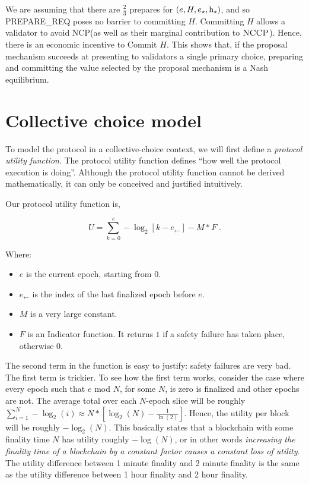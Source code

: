 \documentclass[12pt, final]{article}
\newcommand{\epoch}{\ensuremath{e}}
\newcommand{\hash}{\textnormal{h}}
\newcommand{\hashsource}{\hash_{\star}\xspace}
\newcommand{\epochsource}{\epoch_{\star}\xspace}
\newcommand{\NCP}{\textsc{NCP}\xspace}
\newcommand{\NCCP}{\textsc{NCCP}\xspace}
\newcommand{\LFE}{ \ensuremath{\epoch_{\leftarrow}} \xspace}
\begin{document}
We are assuming that there are $\frac{2}{3}$ prepares for $(e, H, \epochsource, \hashsource)$, and so PREPARE\_REQ poses no barrier to committing $H$. Committing $H$ allows a validator to avoid \NCP (as well as their marginal contribution to $\NCCP$). Hence, there is an economic incentive to Commit $H$. This shows that, if the proposal mechanism succeeds at presenting to validators a single primary choice, preparing and committing the value selected by the proposal mechanism is a Nash equilibrium.

\section{Collective choice model}

To model the protocol in a collective-choice context, we will first define a \emph{protocol utility function}. The protocol utility function defines ``how well the protocol execution is doing''. Although the protocol utility function cannot be derived mathematically, it can only be conceived and justified intuitively.

Our protocol utility function is,

\begin{equation}
U = \sum_{k = 0}^{\epoch} - \log_2\left[ k - \LFE \right] - M * F \; .
\end{equation}


Where:

\begin{itemize}
\item $\epoch$ is the current epoch, starting from $0$.
\item $\LFE$ is the index of the last finalized epoch before $\epoch$.
\item $M$ is a very large constant.
\item $F$ is an Indicator function.  It returns $1$ if a safety failure has taken place, otherwise 0.
\end{itemize}

The second term in the function is easy to justify: safety failures are very bad. The first term is trickier. To see how the first term works, consider the case where every epoch such that $\epoch$ mod $N$, for some $N$, is zero is finalized and other epochs are not. The average total over each $N$-epoch slice will be roughly $\sum_{i=1}^N -\log_2(i) \approx N * \left[ \log_2(N) - \frac{1}{\ln(2)} \right]$. Hence, the utility per block will be roughly $-\log_2(N)$. This basically states that a blockchain with some finality time $N$ has utility roughly $-\log(N)$, or in other words \emph{increasing the finality time of a blockchain by a constant factor causes a constant loss of utility}. The utility difference between 1 minute finality and 2 minute finality is the same as the utility difference between 1 hour finality and 2 hour finality.
\end{document}
